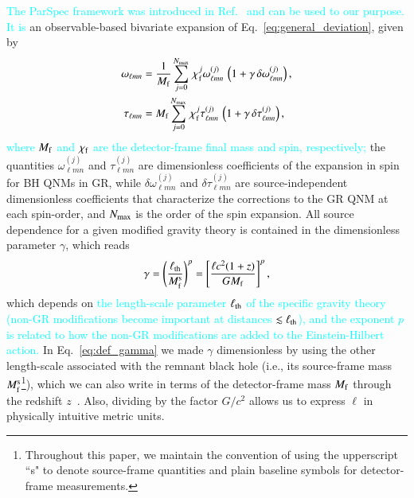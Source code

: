 \documentclass[twocolumn,
               prd,
               aps,
               superscriptaddress,
               tightenlines,
               nofootinbib,
               eqsecnum,
               amsfonts,
               amsmath,
               longbibliography]{revtex4-1}
\newcommand{\ab}[1]{{\textcolor{cyan}{{#1}} }}
\begin{document}
\ab{The ParSpec framework was introduced in Ref.~\cite{Maselli:2019mjd} and can be used to our purpose. It is} an observable-based
bivariate expansion of Eq.~\eqref{eq:general_deviation}, given by
%
\begin{subequations}
\label{eq:kerr_expansion}
\begin{align}
\omega_{\ell m n} &= \frac{1}{M_{\rm f}} \sum_{j = 0}^{N_{\rm max}} \, \chi_{\rm f}^{j} \omega^{(j)}_{\ell m n} \, \left( 1 + \gamma\, \delta \omega^{(j)}_{\ell m n} \right), \\
\tau_{\ell m n}   &= M_{\rm f}     \sum_{j = 0}^{N_{\rm max}} \, \chi_{\rm f}^{j} \tau^{(j)}_{\ell m n}   \, \left( 1 + \gamma\, \delta \tau^{(j)}_{\ell m n} \right),
\end{align}
\end{subequations}
%
\ab{where $M_{\rm f}$ and $\chi_{\rm f}$ are the detector-frame final mass and spin, respectively;}
the quantities $\omega_{\ell m n}^{(j)}$ and $\tau_{\ell m n}^{(j)}$ are dimensionless coefficients of the
expansion in spin for BH QNMs in GR, while $\delta\omega_{\ell m n}^{(j)}$ and $\delta\tau_{\ell m n}^{(j)}$ are 
source-independent dimensionless coefficients that characterize the corrections to the GR QNM at
each spin-order,
%
and $N_{\rm max}$ is the order of the spin expansion.
%
All source dependence for a given modified gravity theory is contained in the
dimensionless parameter $\gamma$, which reads
%
\begin{equation}
\gamma
%
= \left(\frac{\ell_{\rm th}}{M^{\rm s}_{\rm f}}\right)^{p}
%
= \left[
\frac{\ell c^2 (1 + z)}{G M_{\rm f}}
\right]^{p},
\label{eq:def_gamma}
\end{equation}
%
which depends on \ab{the length-scale parameter $\ell_{\rm th}$ of the specific gravity theory 
(non-GR modifications become important at distances $\lesssim \ell_{\rm th}$), and
the exponent $p$ is related to how the non-GR modifications are
added to the Einstein-Hilbert action.}
%
In Eq.~\eqref{eq:def_gamma} we made $\gamma$ dimensionless by using the other
length-scale associated with the remnant black hole (i.e., its source-frame mass
$M^{\rm s}_{\rm f}$\footnote{Throughout this paper, we maintain the convention of
using the upperscript ``s" to denote source-frame quantities and plain baseline
symbols for detector-frame measurements.}), which we can also write in terms of the detector-frame mass $M_{\rm f}$ 
through the redshift $z$~\cite{Krolak:1987ofj}. Also, dividing by the factor $G/c^2$ allows us to
express $\ell$ in physically intuitive metric units.
\end{document}
